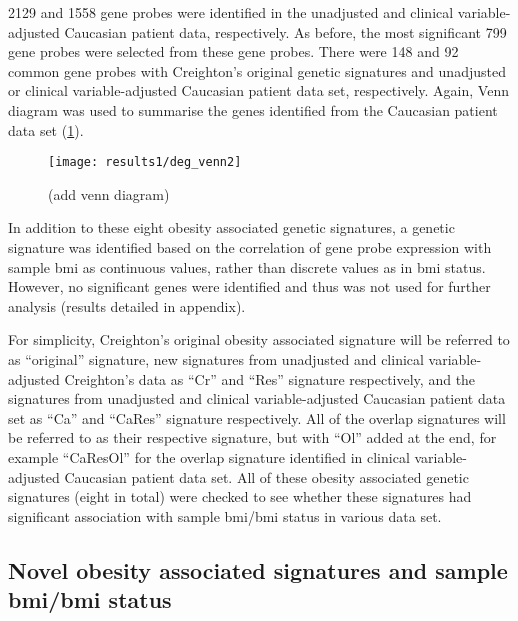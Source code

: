 2129 and 1558 gene probes were identified in the unadjusted and clinical variable-adjusted Caucasian patient data, respectively.
As before, the most significant 799 gene probes were selected from these gene probes.
There were 148 and 92 common gene probes with Creighton's original genetic signatures and unadjusted or clinical variable-adjusted Caucasian patient data set, respectively.
Again, Venn diagram was used to summarise the genes identified from the Caucasian patient data set (\cref{fig:venn2}).
\\

\begin{figure}[htp!]
	\centering
	\texttt{[image: results1/deg\_venn2]}
	\caption[Summary of the \glspl{deg} identified from Creighton's data (Caucasian patient data)]{(add venn diagram)}
	\label{fig:venn2}
\end{figure}

\noindent
In addition to these eight obesity associated genetic signatures, a genetic signature was identified based on the correlation of gene probe expression with sample \gls{bmi} as continuous values, rather than discrete values as in \gls{bmi} status.
However, no significant genes were identified and thus was not used for further analysis (results detailed in appendix).

For simplicity, Creighton's original obesity associated signature will be referred to as ``original'' signature, new signatures from unadjusted and clinical variable-adjusted Creighton's data as ``Cr'' and ``Res'' signature respectively, and the signatures from unadjusted and clinical variable-adjusted Caucasian patient data set as ``Ca'' and ``CaRes'' signature respectively.
All of the overlap signatures will be referred to as their respective signature, but with ``Ol'' added at the end, for example ``CaResOl'' for the overlap signature identified in clinical variable-adjusted Caucasian patient data set.
All of these obesity associated genetic signatures (eight in total) were checked to see whether these signatures had significant association with sample \gls{bmi}/\gls{bmi} status in various data set.

\subsection{Novel obesity associated signatures and sample \gls{bmi}/\gls{bmi} status}
\label{sub:_novel_obesity_associated_signatures_and_sample_bmi}

